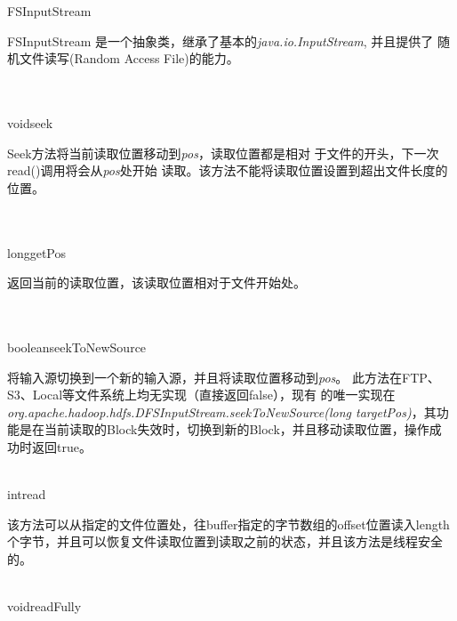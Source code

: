 \begin{XeClass}{FSInputStream}
   
 FSInputStream 是一个抽象类，继承了基本的\emph{java.io.InputStream}, 并且提供了
 随机文件读写(Random Access File)的能力。

  \begin{XeMethod}{\XePublic\\ \XeAbstract\\ }{void}{seek}
       
 Seek方法将当前读取位置移动到\emph{pos}，读取位置都是相对
 于文件的开头，下一次read()调用将会从\emph{pos}处开始
 读取。该方法不能将读取位置设置到超出文件长度的位置。

  \end{XeMethod}

  \begin{XeMethod}{\XePublic\\ \XeAbstract\\ }{long}{getPos}
       
 返回当前的读取位置，该读取位置相对于文件开始处。

  \end{XeMethod}

  \begin{XeMethod}{\XePublic\\ \XeAbstract\\ }{boolean}{seekToNewSource}
       
 将输入源切换到一个新的输入源，并且将读取位置移动到\emph{pos}。
 此方法在FTP、S3、Local等文件系统上均无实现（直接返回false），现有
 的唯一实现在\emph{org.apache.hadoop.hdfs.DFSInputStream.seekToNewSource(long targetPos)}，其功能是在当前读取的Block失效时，切换到新的Block，并且移动读取位置，操作成
 功时返回true。

  \end{XeMethod}

  \begin{XeMethod}{\XePublic\\ }{int}{read}
       
 该方法可以从指定的文件位置处，往buffer指定的字节数组的offset位置读入length
 个字节，并且可以恢复文件读取位置到读取之前的状态，并且该方法是线程安全的。

  \end{XeMethod}

  \begin{XeMethod}{\XePublic\\ }{void}{readFully}
       

\end{XeMethod}
\end{XeClass}
